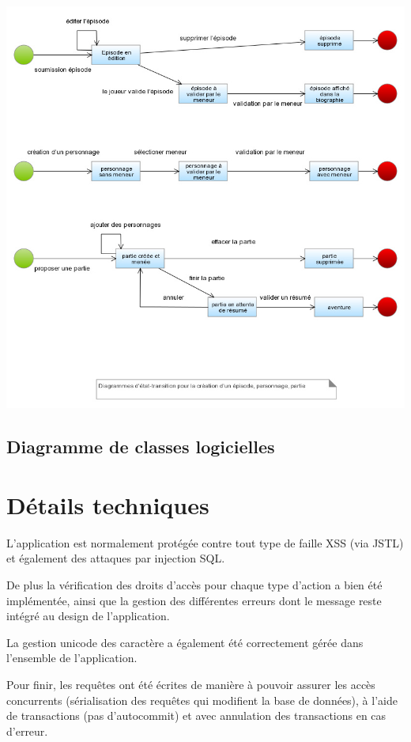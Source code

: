 \documentclass[a4paper, 11pt, titlepage]{article}
\begin{document}
\includegraphics[scale=0.6]{conception/creation-episodes-perso-parties.jpg}

\subsection {Diagramme de classes logicielles}




\section {Détails techniques}

L'application est normalement protégée contre tout type de faille XSS (via JSTL) et également des attaques par injection SQL.

De plus la vérification des droits d'accès pour chaque type d'action a bien été implémentée, ainsi que la gestion des différentes erreurs dont le message reste intégré au design de l'application.

La gestion unicode des caractère a également été correctement gérée dans l'ensemble de l'application.

Pour finir, les requêtes ont été écrites de manière à pouvoir assurer les accès concurrents (sérialisation des requêtes qui modifient la base de données), à l'aide de transactions (pas d'autocommit) et avec annulation des transactions en cas d'erreur.
\end{document}
